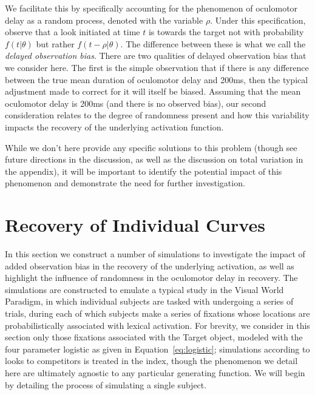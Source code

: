 \documentclass{article}
\begin{document}
We facilitate this by specifically accounting for the phenomenon of oculomotor delay as a random process, denoted with the variable $\rho$. Under this specification, observe that a look initiated at time $t$ is towards the target not with probability $f(t|\theta)$ but rather $f(t - \rho | \theta)$. The difference between these is what we call the \textit{delayed observation bias}. There are two  qualities of delayed observation bias that we consider here. The first is the simple observation that if there is any difference between the true mean duration of oculomotor delay and 200ms, then the typical adjustment made to correct for it will itself be biased. Assuming that the mean oculomotor delay is 200ms (and there is no observed bias), our second consideration relates to the degree of randomness present and how this variability impacts the recovery of the underlying activation function.

While we don't here provide any specific solutions to this problem (though see future directions in the discussion, as well as the discussion on total variation in the appendix), it will be important to identify the potential impact of this phenomenon and demonstrate the need for further investigation.





\section{Recovery of Individual Curves}\label{sec:ind_curves}



In this section we construct a number of simulations to investigate the impact of added observation bias in the recovery of the underlying activation, as well as highlight the influence of randomness in the oculomotor delay in recovery. The simulations are constructed to emulate a typical study in the Visual World Paradigm, in which individual subjects are tasked with undergoing a series of trials, during each of which subjects make a series of fixations whose locations are probabilistically associated with lexical activation. For brevity, we consider in this section only those fixations associated with the Target object, modeled with the four parameter logistic as given in Equation~\ref{eq:logistic}; simulations according to looks to competitors is treated in the index, though the phenomenon we detail here are ultimately agnostic to any particular generating function. We will begin by detailing the process of simulating a single subject. 
\end{document}
